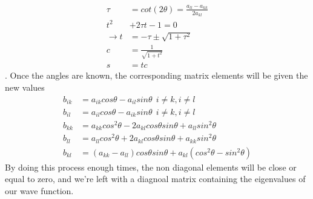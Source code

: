 \documentclass[10pt]{article}
\begin{document}
\begin{multicols}{2}
\begin{align*}
    \tau &= cot(2\theta) = \frac{a_{ll}-a_{kk}}{2a_{kl}}\\
    t^2 &+2\tau t -1 = 0\\
    \rightarrow t &= -\tau\pm \sqrt{1+\tau^2}\\
    c &= \frac{1}{\sqrt{1+t^2}}\\
    s &= tc
\end{align*}.
Once the angles are known, the corresponding matrix elements will be given
the new values
\begin{align*}
    b_{ik} &= a_{ik}cos\theta-a_{il}sin\theta\ \ i\neq k, i \neq l\\
    b_{il} &= a_{il}cos\theta-a_{ik}sin\theta\ \ i\neq k, i \neq l\\
    b_{kk} &= a_{kk}cos^2\theta-2a_{kl}cos\theta sin\theta + a_ {ll}sin^2\theta\\
    b_{ll} &= a_{ll}cos^2\theta+2a_{kl}cos\theta sin\theta + a_ {kk}sin^2\theta\\
    b_ {kl} &= (a_{kk}-a_{ll})cos\theta sin\theta +a_{kl}(cos^2\theta-sin^2\theta)
\end{align*}
By doing this process enough times, the non diagonal elements will be close
or equal to zero, and we're left with a diagnoal matrix containing the
eigenvalues of our wave function.\\


\end{multicols}
\end{document}
